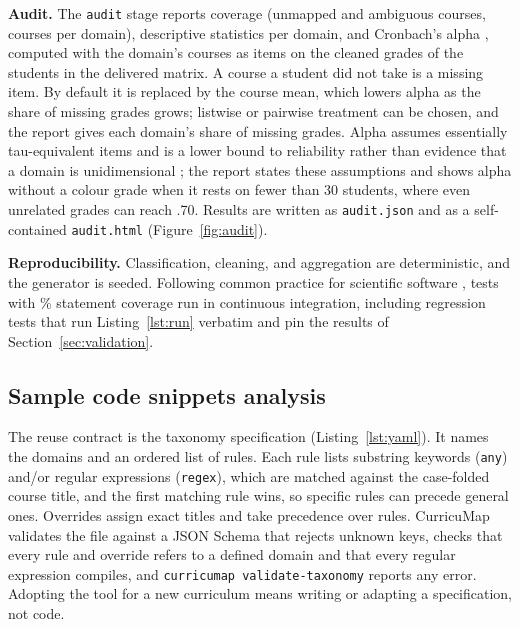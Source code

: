 \documentclass[preprint,12pt,a4paper]{elsarticle}
\begin{document}
\textbf{Audit.} The \texttt{audit} stage reports coverage (unmapped and ambiguous courses, courses per domain), descriptive statistics per domain, and Cronbach's alpha \cite{cronbach1951}, computed with the domain's courses as items on the cleaned grades of the students in the delivered matrix. A course a student did not take is a missing item. By default it is replaced by the course mean, which lowers alpha as the share of missing grades grows; listwise or pairwise treatment can be chosen, and the report gives each domain's share of missing grades. Alpha assumes essentially tau-equivalent items and is a lower bound to reliability rather than evidence that a domain is unidimensional \cite{cortina1993,sijtsma2009,mcneish2018}; the report states these assumptions and shows alpha without a colour grade when it rests on fewer than 30 students, where even unrelated grades can reach .70. Results are written as \texttt{audit.json} and as a self-contained \texttt{audit.html} (Figure~\ref{fig:audit}).

\textbf{Reproducibility.} Classification, cleaning, and aggregation are deterministic, and the generator is seeded. Following common practice for scientific software \cite{wilson2014}, \nTests{} tests with \covPct\% statement coverage run in continuous integration, including regression tests that run Listing~\ref{lst:run} verbatim and pin the results of Section~\ref{sec:validation}.

\subsection{Sample code snippets analysis}

The reuse contract is the taxonomy specification (Listing~\ref{lst:yaml}). It names the domains and an ordered list of rules. Each rule lists substring keywords (\texttt{any}) and/or regular expressions (\texttt{regex}), which are matched against the case-folded course title, and the first matching rule wins, so specific rules can precede general ones. Overrides assign exact titles and take precedence over rules. CurricuMap validates the file against a JSON Schema that rejects unknown keys, checks that every rule and override refers to a defined domain and that every regular expression compiles, and \texttt{curricumap validate-taxonomy} reports any error. Adopting the tool for a new curriculum means writing or adapting a specification, not code.
\end{document}
